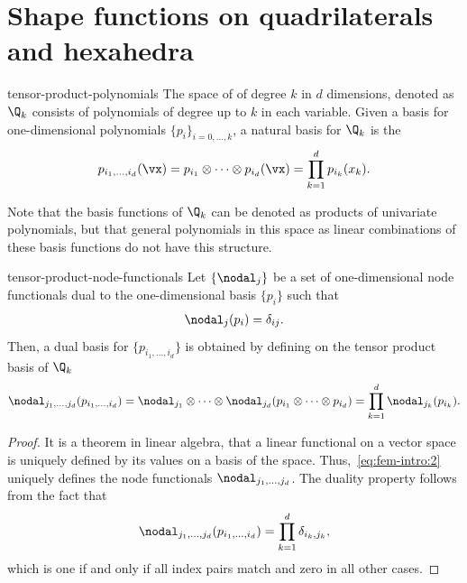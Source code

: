\section{Shape functions on quadrilaterals and hexahedra}

\begin{Definition}{tensor-product-polynomials}
  The space of  of degree $k$ in
  $d$ dimensions, denoted as $\Q_k$ consists of polynomials of degree
  up to $k$ in each variable. Given a basis for one-dimensional
  polynomials $\{p_i\}_{i=0,\dots,k}$, a natural basis for $\Q_k$ is
  the 
  \begin{gather}
    \label{eq:fem-intro:1}
    p_{i_1,\dots,i_d}(\vx)
    = p_{i_1}\otimes \dots\otimes p_{i_d}(\vx)
    = \prod_{k=1}^d p_{i_k}(x_k).
  \end{gather}
\end{Definition}

\begin{remark}
  Note that the basis functions of $\Q_k$ can be denoted as products
  of univariate polynomials, but that general polynomials in this
  space as linear combinations of these basis functions do not have
  this structure.
\end{remark}

\begin{Lemma}{tensor-product-node-functionals}
  Let $\{\nodal_j\}$ be a set of one-dimensional node functionals dual
  to the one-dimensional basis $\{p_i\}$ such that
  \begin{gather}
    \nodal_j(p_i) = \delta_{ij}.
  \end{gather}
  Then, a dual basis for $\{p_{i_1,\dots,i_d}\}$ is obtained by
  defining on the tensor product basis of $\Q_k$
  \begin{gather}
    \label{eq:fem-intro:2}
    \nodal_{j_1,\dots,j_d}(p_{i_1,\dots,i_d})
    = \nodal_{j_1} \otimes \dots\otimes \nodal_{j_d}(p_{i_1}\otimes\dots\otimes p_{i_d})
    = \prod_{k=1}^d \nodal_{j_k}(p_{i_k}).
  \end{gather}
\end{Lemma}

\begin{proof}
  It is a theorem in linear algebra, that a linear functional on a
  vector space is uniquely defined by its values on a basis of the
  space. Thus,~\eqref{eq:fem-intro:2} uniquely defines the node
  functionals $\nodal_{j_1,\dots,j_d}$. The duality property follows
  from the fact that
  \begin{gather*}
    \nodal_{j_1,\dots,j_d}(p_{i_1,\dots,i_d}) = \prod_{k=1}^d \delta_{i_k,j_k},
  \end{gather*}
  which is one if and only if all index pairs match and zero in all
  other cases.
\end{proof}

